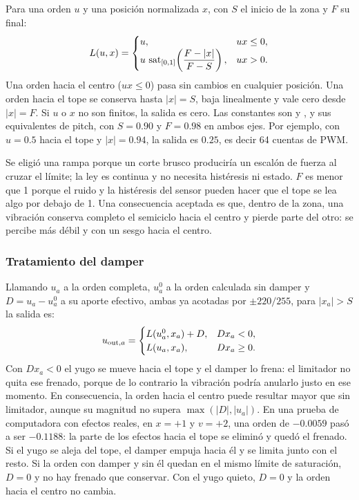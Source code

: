 Para una orden $u$ y una posición normalizada $x$, con $S$ el inicio de la zona y $F$ su final:
\begin{equation}
L(u,x)=
\begin{cases}
u, & ux\le0,\\
u\,\operatorname{sat}_{[0,1]}\!\left(\dfrac{F-|x|}{F-S}\right), & ux>0.
\end{cases}
\label{eq:limite_topes}
\end{equation}
Una orden hacia el centro ($ux\le0$) pasa sin cambios en cualquier posición. Una orden hacia el tope se conserva hasta $|x|=S$, baja linealmente y vale cero desde $|x|=F$. Si $u$ o $x$ no son finitos, la salida es cero. Las constantes son  y , y sus equivalentes de pitch, con $S=0.90$ y $F=0.98$ en ambos ejes. Por ejemplo, con $u=0.5$ hacia el tope y $|x|=0.94$, la salida es $0.25$, es decir 64 cuentas de PWM.

Se eligió una rampa porque un corte brusco produciría un escalón de fuerza al cruzar el límite; la ley es continua y no necesita histéresis ni estado. $F$ es menor que 1 porque el ruido y la histéresis del sensor pueden hacer que el tope se lea algo por debajo de 1. Una consecuencia aceptada es que, dentro de la zona, una vibración conserva completo el semiciclo hacia el centro y pierde parte del otro: se percibe más débil y con un sesgo hacia el centro.

\subsubsection{Tratamiento del damper}
Llamando $u_a$ a la orden completa, $u_a^{0}$ a la orden calculada sin damper y $D=u_a-u_a^{0}$ a su aporte efectivo, ambas ya acotadas por $\pm220/255$, para $|x_a|>S$ la salida es:
\begin{equation}
u_{{\rm out},a}=
\begin{cases}
L(u_a^{0},x_a)+D, & Dx_a<0,\\
L(u_a,x_a), & Dx_a\ge0.
\end{cases}
\label{eq:limite_topes_damper}
\end{equation}
Con $Dx_a<0$ el yugo se mueve hacia el tope y el damper lo frena: el limitador no quita ese frenado, porque de lo contrario la vibración podría anularlo justo en ese momento. En consecuencia, la orden hacia el centro puede resultar mayor que sin limitador, aunque su magnitud no supera $\max(|D|,|u_a|)$. En una prueba de computadora con efectos reales, en $x=+1$ y $v=+2$, una orden de $-0.0059$ pasó a ser $-0.1188$: la parte de los efectos hacia el tope se eliminó y quedó el frenado. Si el yugo se aleja del tope, el damper empuja hacia él y se limita junto con el resto. Si la orden con damper y sin él quedan en el mismo límite de saturación, $D=0$ y no hay frenado que conservar. Con el yugo quieto, $D=0$ y la orden hacia el centro no cambia.

